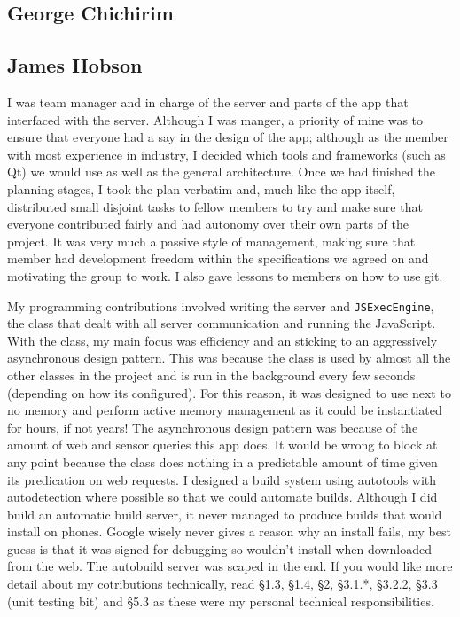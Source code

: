 \documentclass{article}
\begin{document}
\subsection{George Chichirim}
\subsection{James Hobson}
I was team manager and in charge of the server and parts of the app that interfaced with the server. Although I was manger, a priority of mine
was to ensure that everyone had a say in the design of the app; although as the member with most experience in industry, I decided which tools
and frameworks (such as Qt) we would use as well as the general architecture. Once we had finished the planning stages, I took the plan verbatim and,
much like the app itself, distributed small disjoint tasks to fellow members to try and make sure that everyone contributed fairly
and had autonomy over their own parts of the project. It was very much a passive style of management, making sure that member had development freedom
within the specifications we agreed on and motivating the group to work. I also gave lessons to members on how to use git.

My programming contributions involved writing the server and \texttt{JSExecEngine}, the class that dealt with all server communication and
running the JavaScript. With the class, my main focus was efficiency and an sticking to an aggressively asynchronous design pattern. This was
because the class is used by almost all the other classes in the project and is run in the background every few seconds (depending on how its configured).
For this reason, it was designed to use next to no memory and perform active memory management as it could be instantiated for hours, if not years!
The asynchronous design pattern was because of the amount of web and sensor queries this app does. It would be wrong to block at any point because
the class does nothing in a predictable amount of time given its predication on web requests. I designed a build system using autotools
with autodetection where possible so that we could automate builds. Although I did build an automatic build server, it never managed to 
produce builds that would install on phones. Google wisely never gives a reason why an install fails, my best guess is that it was signed for debugging
so wouldn't install when downloaded from the web. The autobuild server was scaped in the end. If you would like more detail about my cotributions
technically, read §1.3, §1.4, §2, §3.1.*, §3.2.2, §3.3 (unit testing bit) and §5.3 as these were my personal technical responsibilities.
\end{document}

